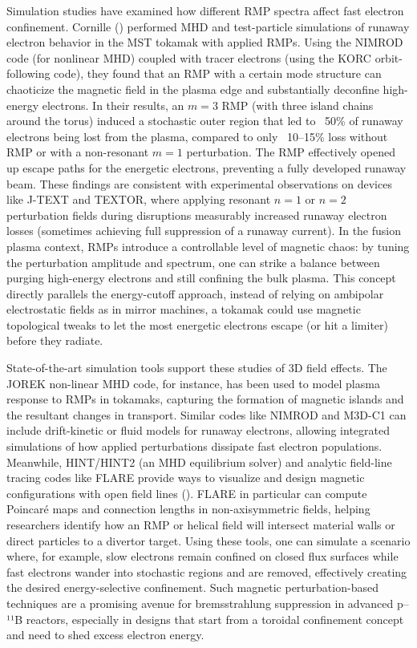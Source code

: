 \documentclass[12pt]{article}
\begin{document}
Simulation studies have examined how different RMP spectra affect fast electron confinement. Cornille (\cite{10.1063/5.0087314}) performed MHD and test-particle simulations of runaway electron behavior in the MST tokamak with applied RMPs. Using the NIMROD code (for nonlinear MHD) coupled with tracer electrons (using the KORC orbit-following code), they found that an RMP with a certain mode structure can chaoticize the magnetic field in the plasma edge and substantially deconfine high-energy electrons. In their results, an $m=3$ RMP (with three island chains around the torus) induced a stochastic outer region that led to ~50\% of runaway electrons being lost from the plasma, compared to only ~10–15\% loss without RMP or with a non-resonant $m=1$ perturbation. The RMP effectively opened up escape paths for the energetic electrons, preventing a fully developed runaway beam. These findings are consistent with experimental observations on devices like J-TEXT and TEXTOR, where applying resonant $n=1$ or $n=2$ perturbation fields during disruptions measurably increased runaway electron losses (sometimes achieving full suppression of a runaway current). In the fusion plasma context, RMPs introduce a controllable level of magnetic chaos: by tuning the perturbation amplitude and spectrum, one can strike a balance between purging high-energy electrons and still confining the bulk plasma. This concept directly parallels the energy-cutoff approach, instead of relying on ambipolar electrostatic fields as in mirror machines, a tokamak could use magnetic topological tweaks to let the most energetic electrons escape (or hit a limiter) before they radiate.

State-of-the-art simulation tools support these studies of 3D field effects. The JOREK non-linear MHD code, for instance, has been used to model plasma response to RMPs in tokamaks, capturing the formation of magnetic islands and the resultant changes in transport. Similar codes like NIMROD and M3D-C1 can include drift-kinetic or fluid models for runaway electrons, allowing integrated simulations of how applied perturbations dissipate fast electron populations. Meanwhile, HINT/HINT2 (an MHD equilibrium solver) and analytic field-line tracing codes like FLARE provide ways to visualize and design magnetic configurations with open field lines (\cite{FLARE}). FLARE in particular can compute Poincaré maps and connection lengths in non-axisymmetric fields, helping researchers identify how an RMP or helical field will intersect material walls or direct particles to a divertor target. Using these tools, one can simulate a scenario where, for example, slow electrons remain confined on closed flux surfaces while fast electrons wander into stochastic regions and are removed, effectively creating the desired energy-selective confinement. Such magnetic perturbation-based techniques are a promising avenue for bremsstrahlung suppression in advanced p–¹¹B reactors, especially in designs that start from a toroidal confinement concept and need to shed excess electron energy.
\end{document}
